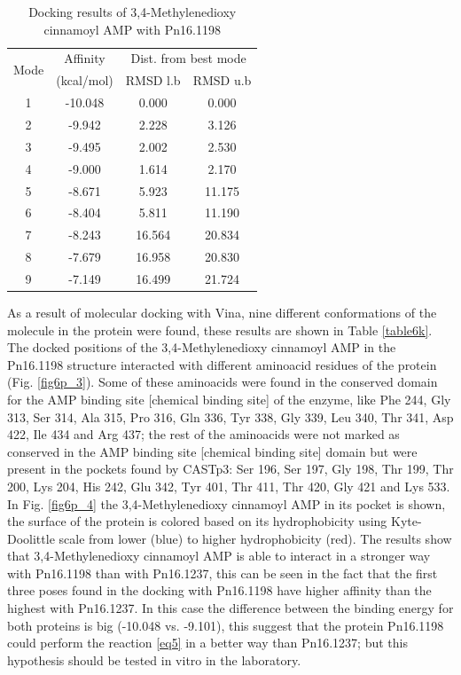 \documentclass[12pt]{article}
\begin{document}
	\newpage
	
	\begin{table}
		\centering
		\caption{Docking results of 3,4-Methylenedioxy cinnamoyl AMP with Pn16.1198}
		\label{table6p}
		\begin{tabular}{cccc}
			\toprule
			\multirow{2}{*}{Mode} & Affinity & \multicolumn{2}{c}{Dist. from best mode}\\
			&  (kcal/mol) & RMSD l.b & RMSD u.b\\
			\midrule
			1 & -10.048  &    0.000  &    0.000\\
			2 & -9.942   &   2.228   &   3.126\\
			3 & -9.495   &   2.002   &   2.530\\
			4 & -9.000   &   1.614   &   2.170\\
			5 & -8.671   &   5.923   &  11.175\\
			6 & -8.404   &   5.811   &  11.190\\
			7 & -8.243   &  16.564   &  20.834\\
			8 & -7.679   &  16.958   &  20.830\\
			9 & -7.149   &  16.499   &  21.724\\
			\bottomrule
			
		\end{tabular}
	\end{table}
	
	As a result of molecular docking with Vina, nine different conformations of the molecule in the protein were found, these results are shown in Table \ref{table6k}. The docked positions of the 3,4-Methylenedioxy cinnamoyl AMP in the Pn16.1198 structure interacted with different aminoacid residues of the protein (Fig. \ref{fig6p_3}). Some of these aminoacids were found in the conserved domain for the AMP binding site [chemical binding site] of the enzyme, like Phe 244, Gly 313, Ser 314, Ala 315, Pro 316, Gln 336, Tyr 338, Gly 339, Leu 340, Thr 341, Asp 422, Ile 434 and Arg 437; the rest of the aminoacids were not marked as conserved in the AMP binding site [chemical binding site] domain but were present in the pockets found by CASTp3: Ser 196, Ser 197, Gly 198, Thr 199, Thr 200, Lys 204, His 242, Glu 342, Tyr 401, Thr 411, Thr 420, Gly 421 and Lys 533. In Fig. \ref{fig6p_4} the 3,4-Methylenedioxy cinnamoyl AMP in its pocket is shown, the surface of the protein is colored based on its hydrophobicity using Kyte-Doolittle scale from lower (blue) to higher hydrophobicity (red). The results show that 3,4-Methylenedioxy cinnamoyl AMP is able to interact in a stronger way with Pn16.1198 than with Pn16.1237, this can be seen in the fact that the first three poses found in the docking with Pn16.1198 have higher affinity than the highest with Pn16.1237. In this case the difference between the binding energy for both proteins is big (-10.048 vs. -9.101), this suggest that the protein Pn16.1198 could perform the reaction \ref{eq5} in a better way than Pn16.1237; but this hypothesis should be tested in vitro in the laboratory.
	
\end{document}
